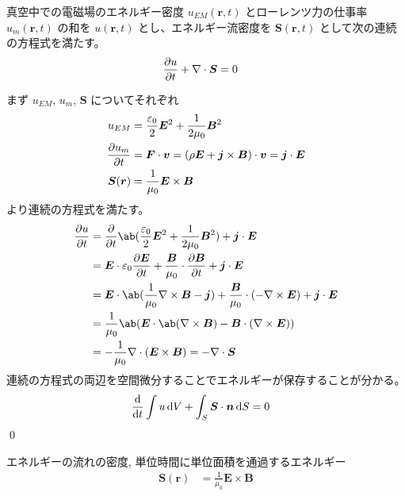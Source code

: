\documentclass[uplatex,dvipdfmx,a4paper,11pt]{jlreq}
\makeatletter
\newcommand{\EE}{\bm{E}}
\newcommand{\BB}{\bm{B}}
\newcommand{\rr}{\bm{r}}
\renewcommand{\SS}{\bm{S}}
\newcommand{\vnabla}{\mathbf{\nabla}}
\numberwithin{equation}{section}
\theoremstyle{definition}
\renewenvironment{proof}[1][\proofname]{\par
  \normalfont
  \topsep6\p@\@plus6\p@ \trivlist
  \item[\hskip\labelsep{\bfseries #1}\@addpunct{\bfseries}]\ignorespaces\quad\par
}{%
  \qed\endtrivlist\@endpefalse
}
\renewcommand\proofname{証明}
\makeatother
\begin{document}
\begin{theorem}[エネルギー保存則]
  真空中での電磁場のエネルギー密度 $u_{EM}(\rr, t)$ とローレンツ力の仕事率 $u_{m}(\rr, t)$ の和を $u(\rr, t)$ とし、エネルギー流密度を $\SS(\rr, t)$ として次の連続の方程式を満たす。
  \begin{align}
    \diffp{u}{t} + \vnabla\cdot\SS & = 0
  \end{align}
\end{theorem}
\begin{proof}
  まず $u_{EM}$, $u_m$, $\SS$ についてそれぞれ
  \begin{align}
    u_{EM}         & = \frac{\varepsilon_0}{2}\EE^2 + \frac{1}{2\mu_0}\BB^2                        \\
    \diffp{u_m}{t} & = \bm{F}\cdot\bm{v} = (\rho\EE + \bm{j}\times\BB)\cdot\bm{v} = \bm{j}\cdot\EE \\
    \SS(\rr)       & = \frac{1}{\mu_0}\EE\times\BB
  \end{align}
  より連続の方程式を満たす。
  \begin{align}
    \diffp{u}{t} & = \diffp{}{t}\ab(\frac{\varepsilon_0}{2}\EE^2 + \frac{1}{2\mu_0}\BB^2) + \bm{j}\cdot\EE                              \\
                 & = \EE\cdot\varepsilon_0\diffp{\EE}{t} + \frac{\BB}{\mu_0}\cdot\diffp{\BB}{t} + \bm{j}\cdot\EE                        \\
                 & = \EE\cdot\ab(\frac{1}{\mu_0}\vnabla\times\BB - \bm{j}) + \frac{\BB}{\mu_0}\cdot(-\vnabla\times\EE) + \bm{j}\cdot\EE \\
                 & = \frac{1}{\mu_0}\ab(\EE\cdot\ab(\vnabla\times\BB) - \BB\cdot(\vnabla\times\EE))                                     \\
                 & = -\frac{1}{\mu_0}\vnabla\cdot(\EE\times\BB) = -\vnabla\cdot\SS
  \end{align}
  連続の方程式の両辺を空間微分することでエネルギーが保存することが分かる。
  \begin{align}
    \diff{}{t}\int u\dl{V} + \int_S\SS\cdot\bm{n}\dl{S} & = 0
  \end{align}
\end{proof}

\begin{definition}
  エネルギーの流れの密度, 単位時間に単位面積を通過するエネルギー
  \begin{align}
    \SS(\rr) & = \frac{1}{\mu_0}\EE\times\BB
  \end{align}
\end{definition}
\end{document}

